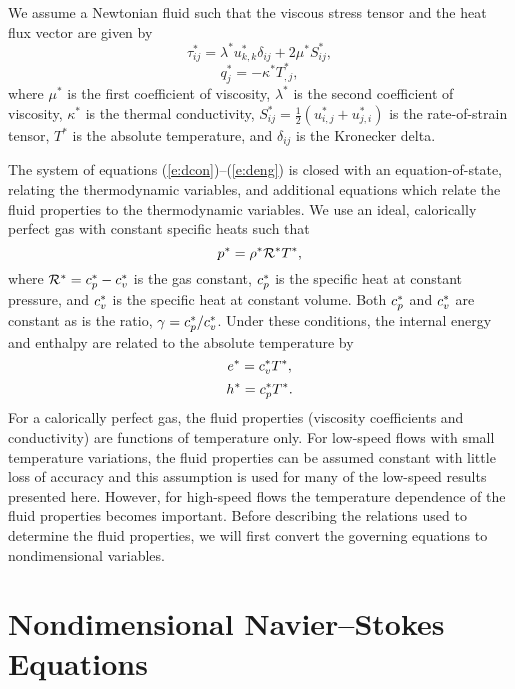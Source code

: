 We assume a Newtonian fluid such that the viscous stress tensor and the heat
flux vector are given by
%
  \begin{equation} \label{e:dtau}
    \tau^*_{ij} = \lambda^* u^*_{k,k} \delta_{ij} + 2 \mu^* S^*_{ij},
  \end{equation}
%
  \begin{equation} \label{e:dheat}
    q^*_{j} = - \kappa^* T^*_{,j},
  \end{equation}
%
where $\mu^*$ is the first coefficient of viscosity, $\lambda^*$ is the second
coefficient of viscosity, $\kappa^*$ is the thermal conductivity,
$S^*_{ij}=\frac{1}{2}(u^*_{i,j}+u^*_{j,i})$ is the rate-of-strain tensor,
$T^*$ is the absolute temperature, and $\delta_{ij}$ is the Kronecker delta.
  
The system of equations (\ref{e:dcon})--(\ref{e:deng}) is closed with an
equation-of-state, relating the thermodynamic variables, and additional
equations which relate the fluid properties to the thermodynamic variables.
We use an ideal, calorically perfect gas with constant specific heats such
that
%
  \begin{equation} \label{e:dideal}
    p^* = \rho^* {\cal R}^* T^* ,
  \end{equation}
%
where ${\cal R}^* = c_p^* - c_v^*$ is the gas constant, $c_p^*$ is the specific
heat at constant pressure, and $c_v^*$ is the specific heat at constant
volume.  Both $c_p^*$ and $c_v^*$ are constant as is the ratio, $\gamma =
{c_p^*} / {c_v^*}$.  Under these conditions, the internal energy and enthalpy
are related to the absolute temperature by
%
  \begin{equation} \label{e:eoft}
    e^* = c_v^* T^* ,
  \end{equation}
%
  \begin{equation}  \label{e:hoft}
    h^* = c_p^* T^* .
  \end{equation}
%
For a calorically perfect gas, the fluid properties (viscosity coefficients
and conductivity) are functions of temperature only.  For low-speed flows with
small temperature variations, the fluid properties can be assumed constant
with little loss of accuracy and this assumption is used for many of the
low-speed results presented here.  However, for high-speed flows the
temperature dependence of the fluid properties becomes important.  Before
describing the relations used to determine the fluid properties, we will first
convert the governing equations to nondimensional variables.

\section{Nondimensional Navier--Stokes Equations \label{s:eqn}}

